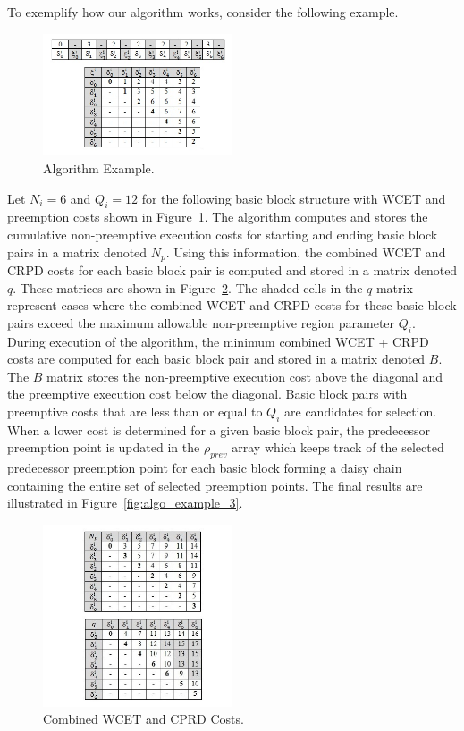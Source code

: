 To exemplify how our algorithm works, consider the following example.
\begin{figure}[h!]
\begin{center}
\includegraphics[width=0.5\textwidth]{algo_example.jpg}
\caption{Algorithm Example.}
\label{fig:algo_example}
\end{center}
\end{figure}
Let $N_i=6$ and $Q_i=12$ for the following basic block structure with WCET and preemption costs shown in Figure~\ref{fig:algo_example}.  The algorithm computes and stores the cumulative non-preemptive execution costs for starting and ending basic block pairs in a matrix denoted $N_p$.  Using this information, the combined WCET and CRPD costs for each basic block pair is computed and stored in a matrix denoted $q$.  These matrices are shown in Figure~\ref{fig:algo_example_2}.  The shaded cells in the $q$ matrix represent cases where the combined WCET and CRPD costs for these basic block pairs exceed the maximum allowable non-preemptive region parameter $Q_i$.  During execution of the algorithm, the minimum combined WCET + CRPD costs are computed for each basic block pair and stored in a matrix denoted $B$.  The $B$ matrix stores the non-preemptive execution cost above the diagonal and the preemptive execution cost below the diagonal.  Basic block pairs with preemptive costs that are less than or equal to $Q_i$ are candidates for selection.  When a lower cost is determined for a given basic block pair, the predecessor preemption point is updated in the $\rho_{prev}$ array which keeps track of the selected predecessor preemption point for each basic block forming a daisy chain containing the entire set of selected preemption points.  The final results are illustrated in Figure~\ref{fig:algo_example_3}.
\begin{figure}[h!]
\begin{center}
\includegraphics[width=0.5\textwidth]{algo_example_2.jpg}
\caption{Combined WCET and CPRD Costs.}
\label{fig:algo_example_2}
\end{center}
\end{figure}
